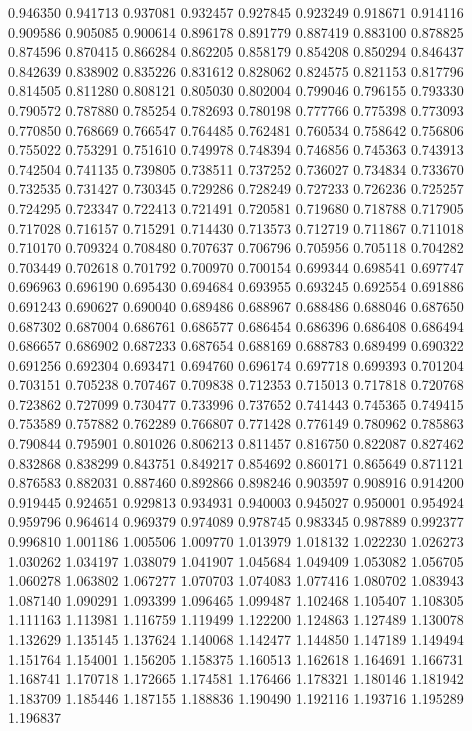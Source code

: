 0.946350
0.941713
0.937081
0.932457
0.927845
0.923249
0.918671
0.914116
0.909586
0.905085
0.900614
0.896178
0.891779
0.887419
0.883100
0.878825
0.874596
0.870415
0.866284
0.862205
0.858179
0.854208
0.850294
0.846437
0.842639
0.838902
0.835226
0.831612
0.828062
0.824575
0.821153
0.817796
0.814505
0.811280
0.808121
0.805030
0.802004
0.799046
0.796155
0.793330
0.790572
0.787880
0.785254
0.782693
0.780198
0.777766
0.775398
0.773093
0.770850
0.768669
0.766547
0.764485
0.762481
0.760534
0.758642
0.756806
0.755022
0.753291
0.751610
0.749978
0.748394
0.746856
0.745363
0.743913
0.742504
0.741135
0.739805
0.738511
0.737252
0.736027
0.734834
0.733670
0.732535
0.731427
0.730345
0.729286
0.728249
0.727233
0.726236
0.725257
0.724295
0.723347
0.722413
0.721491
0.720581
0.719680
0.718788
0.717905
0.717028
0.716157
0.715291
0.714430
0.713573
0.712719
0.711867
0.711018
0.710170
0.709324
0.708480
0.707637
0.706796
0.705956
0.705118
0.704282
0.703449
0.702618
0.701792
0.700970
0.700154
0.699344
0.698541
0.697747
0.696963
0.696190
0.695430
0.694684
0.693955
0.693245
0.692554
0.691886
0.691243
0.690627
0.690040
0.689486
0.688967
0.688486
0.688046
0.687650
0.687302
0.687004
0.686761
0.686577
0.686454
0.686396
0.686408
0.686494
0.686657
0.686902
0.687233
0.687654
0.688169
0.688783
0.689499
0.690322
0.691256
0.692304
0.693471
0.694760
0.696174
0.697718
0.699393
0.701204
0.703151
0.705238
0.707467
0.709838
0.712353
0.715013
0.717818
0.720768
0.723862
0.727099
0.730477
0.733996
0.737652
0.741443
0.745365
0.749415
0.753589
0.757882
0.762289
0.766807
0.771428
0.776149
0.780962
0.785863
0.790844
0.795901
0.801026
0.806213
0.811457
0.816750
0.822087
0.827462
0.832868
0.838299
0.843751
0.849217
0.854692
0.860171
0.865649
0.871121
0.876583
0.882031
0.887460
0.892866
0.898246
0.903597
0.908916
0.914200
0.919445
0.924651
0.929813
0.934931
0.940003
0.945027
0.950001
0.954924
0.959796
0.964614
0.969379
0.974089
0.978745
0.983345
0.987889
0.992377
0.996810
1.001186
1.005506
1.009770
1.013979
1.018132
1.022230
1.026273
1.030262
1.034197
1.038079
1.041907
1.045684
1.049409
1.053082
1.056705
1.060278
1.063802
1.067277
1.070703
1.074083
1.077416
1.080702
1.083943
1.087140
1.090291
1.093399
1.096465
1.099487
1.102468
1.105407
1.108305
1.111163
1.113981
1.116759
1.119499
1.122200
1.124863
1.127489
1.130078
1.132629
1.135145
1.137624
1.140068
1.142477
1.144850
1.147189
1.149494
1.151764
1.154001
1.156205
1.158375
1.160513
1.162618
1.164691
1.166731
1.168741
1.170718
1.172665
1.174581
1.176466
1.178321
1.180146
1.181942
1.183709
1.185446
1.187155
1.188836
1.190490
1.192116
1.193716
1.195289
1.196837
